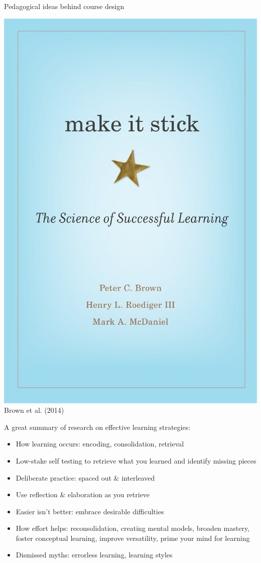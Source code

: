 \documentclass[aspectratio=169]{beamer}
\newenvironment{Slide}[1]%
  {\begin{frame}[environment=Slide]{#1}}
  {\end{frame}}%
\begin{document}
\begin{Slide}{Pedagogical ideas behind course design}
  \begin{minipage}{0.3\textwidth}
    \includegraphics[height=0.6\textheight]{Pictures/brown}\\
    Brown et al. (2014)
  \end{minipage}%
  \begin{minipage}{0.7\textwidth}
    A great summary of research on effective learning strategies:
    \begin{itemize}
      \item How learning occurs: encoding, consolidation, retrieval
      \item Low-stake self testing to retrieve what you learned and identify missing pieces
      \item Deliberate practice: spaced out \& interleaved
      \item Use reflection \& elaboration as you retrieve
      \item Easier isn't better: embrace desirable difficulties
      \item How effort helps: reconsolidation, creating mental models, broaden mastery, foster conceptual learning, improve versatility, prime your mind for learning 
      \item Dismissed myths: errorless learning, learning styles
    \end{itemize}
  \end{minipage}
  

\end{Slide}
\end{document}
